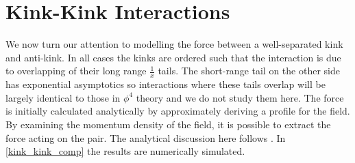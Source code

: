 \documentclass[11pt, oneside]{article}  	%
\numberwithin{equation}{section}
\begin{document}
 \section{Kink-Kink Interactions}
 We now turn our attention to modelling the force between a well-separated kink and anti-kink. In all cases the kinks are ordered such that the interaction is due to overlapping of their long range $\frac{1}{x}$ tails. The short-range tail on the other side has exponential asymptotics so interactions where these tails overlap will be largely identical to those in $\phi^4$ theory and we do not study them here. The force is initially calculated analytically by approximately deriving a profile for the field. By examining the momentum density of the field, it is possible to extract the force acting on the pair. The analytical discussion here follows \cite{manton-paper}. In \textsection \ref{kink_kink_comp} the results are numerically simulated.\par
\end{document}
